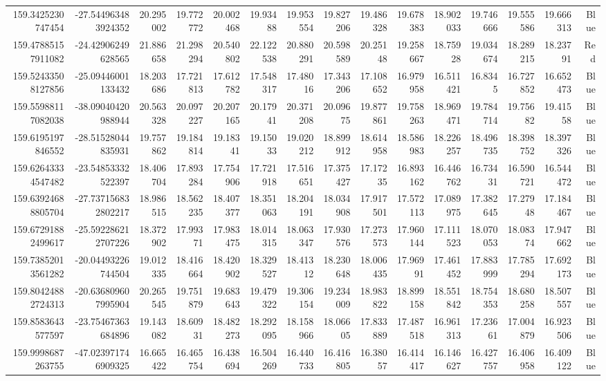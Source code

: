 \begin{center}
\begin{longtable}{rrrrrrrrrrrrrrr}
159.3425230747454 & -27.544963483924352 & 20.295002 & 19.772772 & 20.002468 & 19.93488 & 19.953554 & 19.827206 & 19.486328 & 19.678383 & 18.902033 & 19.746666 & 19.555586 & 19.666313 & Blue \\
159.47885157911082 & -24.42906249628565 & 21.886658 & 21.298294 & 20.540802 & 22.122538 & 20.880291 & 20.598589 & 20.25148 & 19.258667 & 18.75928 & 19.034674 & 18.289215 & 18.23791 & Red \\
159.52433508127856 & -25.09446001133432 & 18.203686 & 17.721813 & 17.612782 & 17.548317 & 17.48016 & 17.343206 & 17.108652 & 16.979958 & 16.511421 & 16.8345 & 16.727852 & 16.652473 & Blue \\
159.55988117082038 & -38.09040420988944 & 20.563328 & 20.097227 & 20.207165 & 20.17941 & 20.371208 & 20.09675 & 19.877861 & 19.758263 & 18.969471 & 19.784714 & 19.75682 & 19.41558 & Blue \\
159.6195197846552 & -28.51528044835931 & 19.757862 & 19.184814 & 19.18341 & 19.15033 & 19.020212 & 18.899912 & 18.614958 & 18.586983 & 18.226257 & 18.496735 & 18.398752 & 18.397326 & Blue \\
159.62643334547482 & -23.54853332522397 & 18.406704 & 17.893284 & 17.754906 & 17.721918 & 17.516651 & 17.375427 & 17.17235 & 16.893162 & 16.446762 & 16.73431 & 16.590721 & 16.544472 & Blue \\
159.63924688805704 & -27.737156832802217 & 18.986515 & 18.562235 & 18.407377 & 18.351063 & 18.204191 & 18.034908 & 17.917501 & 17.572113 & 17.089975 & 17.382645 & 17.27948 & 17.184467 & Blue \\
159.67291882499617 & -25.592286212707226 & 18.372902 & 17.99371 & 17.983475 & 18.014315 & 18.063347 & 17.930576 & 17.273573 & 17.960144 & 17.111523 & 18.070053 & 18.08374 & 17.947662 & Blue \\
159.73852013561282 & -20.04493226744504 & 19.012335 & 18.416664 & 18.420902 & 18.329527 & 18.41312 & 18.230648 & 18.006435 & 17.96991 & 17.461452 & 17.883999 & 17.785294 & 17.692173 & Blue \\
159.80424882724313 & -20.636809607995904 & 20.265545 & 19.751879 & 19.683643 & 19.479322 & 19.306154 & 19.234009 & 18.983822 & 18.899158 & 18.551842 & 18.754353 & 18.680258 & 18.507557 & Blue \\
159.8583643577597 & -23.75467363684896 & 19.143082 & 18.60931 & 18.482273 & 18.292095 & 18.158966 & 18.06605 & 17.833889 & 17.487518 & 16.961313 & 17.23661 & 17.004879 & 16.923506 & Blue \\
159.9998687263755 & -47.023971746909325 & 16.665422 & 16.465754 & 16.438694 & 16.504269 & 16.440733 & 16.416805 & 16.38057 & 16.414417 & 16.146627 & 16.427757 & 16.406958 & 16.409122 & Blue \\

\end{longtable}
\end{center}

